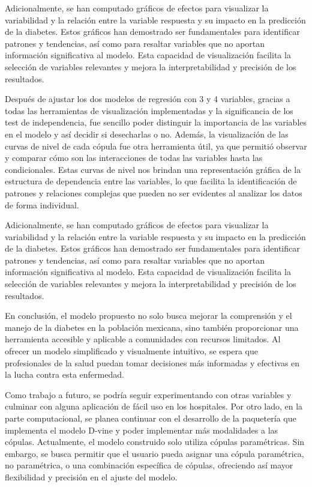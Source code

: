Adicionalmente, se han computado gráficos de efectos para visualizar la variabilidad y la relación entre la variable respuesta y su impacto en la predicción de la diabetes. Estos gráficos han demostrado ser fundamentales para identificar patrones y tendencias, así como para resaltar variables que no aportan información significativa al modelo. Esta capacidad de visualización facilita la selección de variables relevantes y mejora la interpretabilidad y precisión de los resultados.

Después de ajustar los dos modelos de regresión con 3 y 4 variables, gracias a todas las herramientas de visualización implementadas y la significancia de los test de independencia, fue sencillo poder distinguir la importancia de las variables en el modelo y así decidir si desecharlas o no. Además, la visualización de las curvas de nivel de cada cópula fue otra herramienta útil, ya que permitió observar y comparar cómo son las interacciones de todas las variables hasta las condicionales. Estas curvas de nivel nos brindan una representación gráfica de la estructura de dependencia entre las variables, lo que facilita la identificación de patrones y relaciones complejas que pueden no ser evidentes al analizar los datos de forma individual.

Adicionalmente, se han computado gráficos de efectos para visualizar la variabilidad y la relación entre la variable respuesta y su impacto en la predicción de la diabetes. Estos gráficos han demostrado ser fundamentales para identificar patrones y tendencias, así como para resaltar variables que no aportan información significativa al modelo. Esta capacidad de visualización facilita la selección de variables relevantes y mejora la interpretabilidad y precisión de los resultados.

En conclusión, el modelo propuesto no solo busca mejorar la comprensión y el manejo de la diabetes en la población mexicana, sino también proporcionar una herramienta accesible y aplicable a comunidades con recursos limitados. Al ofrecer un modelo simplificado y visualmente intuitivo, se espera que profesionales de la salud puedan tomar decisiones más informadas y efectivas en la lucha contra esta enfermedad.

Como trabajo a futuro, se podría seguir experimentando con otras variables y culminar con alguna aplicación de fácil uso en los hospitales. Por otro lado, en la parte computacional, se planea continuar con el desarrollo de la paquetería que implementa el modelo D-vine y poder implementar más modalidades a las cópulas. Actualmente, el modelo construido solo utiliza cópulas paramétricas. Sin embargo, se busca permitir que el usuario pueda asignar una cópula paramétrica, no paramétrica, o una combinación específica de cópulas, ofreciendo así mayor flexibilidad y precisión en el ajuste del modelo. 

